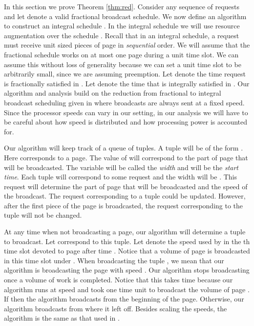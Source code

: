 \documentclass[11pt]{article}
\begin{document}
In this section we prove Theorem \ref{thm:red}. Consider any sequence of requests and let  denote a valid fractional broadcast schedule.   We now define an algorithm to construct an integral schedule .  In the integral schedule we will use  resource augmentation over the schedule .  Recall that in an integral schedule, a request  must receive  unit sized pieces of page  in \emph{sequential} order.  We will assume that the fractional schedule works on at most one page during a unit time slot.  We can assume this without loss of generality because we can set a unit time slot to be arbitrarily small, since we are assuming preemption. Let  denote the time request  is fractionally satisfied in .  Let  denote the time that  is integrally satisfied in . Our algorithm and analysis build on the reduction from fractional to integral broadcast scheduling given in  \cite{BansalKN09} where broadcasts are always sent at a fixed speed. Since the processor speeds can vary in our setting, in our analysis we will have to be careful about how speed is distributed and how processing power is accounted for.




Our algorithm will keep track of a queue  of tuples.  A tuple will be of the form .   Here  corresponds to a page. The value of  will correspond to the part of page  that will be broadcasted.  The variable  will be called the \emph{width} and  will be the \emph{start time}.     Each tuple  will correspond to some request  and the width will be .  This request will determine the part of page  that will be broadcasted and the speed of the broadcast.  The request corresponding to a tuple could be updated.  However, after the first piece of the page is broadcasted, the request corresponding to the tuple will not be changed. 

At any time when not broadcasting a page, our algorithm will determine a tuple  to broadcast.  Let  correspond to this tuple.  Let  denote the speed used by   in the th time slot devoted to page  after time .  Notice that a  volume of page  is broadcasted in this time slot under .   When broadcasting the tuple , we mean that our algorithm is broadcasting the page  with speed .  Our algorithm stops broadcasting  once a  volume of work is completed.  Notice that this takes  time because our algorithm runs at speed  and  took one time unit to broadcast the  volume of page .  If  then the algorithm broadcasts  from the beginning of the page.  Otherwise, our algorithm broadcasts  from where it left off.    Besides scaling the speeds, the algorithm is the same as that used in  \cite{BansalKN09}.
\end{document}
